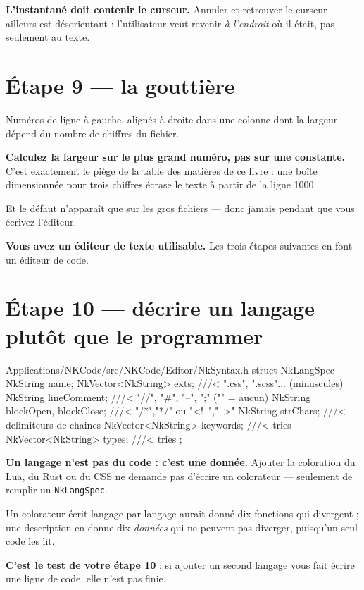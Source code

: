 \begin{nkretenir}
\textbf{L'instantané doit contenir le curseur.} Annuler et retrouver le curseur
ailleurs est désorientant : l'utilisateur veut revenir \emph{à l'endroit} où il
était, pas seulement au texte.
\end{nkretenir}

\section{Étape 9 --- la gouttière}

Numéros de ligne à gauche, alignés à droite dans une colonne dont la largeur
dépend du nombre de chiffres du fichier.

\begin{nkretenir}
\textbf{Calculez la largeur sur le plus grand numéro, pas sur une constante.}
C'est exactement le piège de la table des matières de ce livre : une boîte
dimensionnée pour trois chiffres écrase le texte à partir de la ligne 1000.

Et le défaut n'apparaît que sur les gros fichiers --- donc jamais pendant que
vous écrivez l'éditeur.
\end{nkretenir}

\noindent \textbf{Vous avez un éditeur de texte utilisable.} Les trois étapes
suivantes en font un éditeur de code.

\section{Étape 10 --- décrire un langage plutôt que le programmer}

\begin{nkcode}{Applications/NKCode/src/NKCode/Editor/NkSyntax.h}
struct NkLangSpec {
        NkString name;
        NkVector<NkString> exts;         ///< ".css", ".scss"... (minuscules)
        NkString lineComment;            ///< "//", "#", "--", ";" ("" = aucun)
        NkString blockOpen, blockClose;  ///< "/*","*/" ou "<!--","-->"
        NkString strChars;               ///< delimiteurs de chaines
        NkVector<NkString> keywords;     ///< tries
        NkVector<NkString> types;        ///< tries
};
\end{nkcode}

\begin{nkretenir}
\textbf{Un langage n'est pas du code : c'est une donnée.} Ajouter la coloration
du Lua, du Rust ou du CSS ne demande pas d'écrire un colorateur --- seulement de
remplir un \texttt{NkLangSpec}.

Un colorateur écrit langage par langage aurait donné dix fonctions qui divergent ;
une description en donne dix \emph{données} qui ne peuvent pas diverger, puisqu'un
seul code les lit.

\textbf{C'est le test de votre étape 10} : si ajouter un second langage vous fait
écrire une ligne de code, elle n'est pas finie.
\end{nkretenir}


